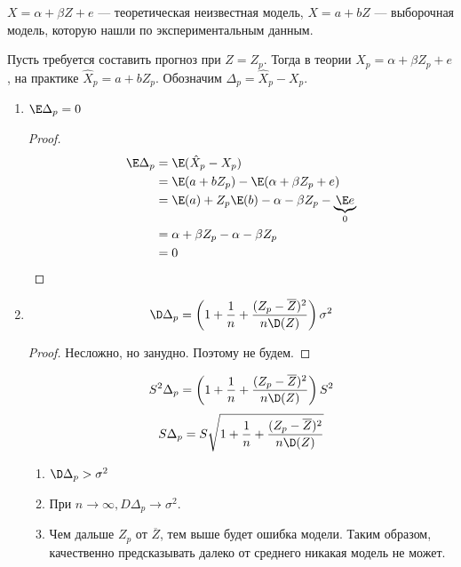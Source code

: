\(X = \alpha + \beta Z + e\) --- теоретическая неизвестная модель, \(X = a + bZ\) --- выборочная модель, которую нашли по экспериментальным данным.

Пусть требуется составить прогноз при \(Z = Z_p\). Тогда в теории \(X_p = \alpha + \beta Z_p + e\), на практике \(\hat{X}_p = a + bZ_p\). Обозначим \(\Delta_p = \hat{X}_p - X_p\).
\begin{prop}\itemfix
    \begin{enumerate}
        \item \(\E \Delta_p = 0\)
              \begin{proof}
                  \begin{align*}
                      \E \Delta_p & = \E( \hat{X}_p - X_p)                                        \\
                                  & = \E(a + bZ_p) - \E(\alpha + \beta Z_p + e)                   \\
                                  & = \E(a) + Z_p\E(b) - \alpha - \beta Z_p - \underbrace{\E e}_0 \\
                                  & = \alpha + \beta Z_p - \alpha - \beta Z_p                     \\
                                  & = 0
                  \end{align*}
              \end{proof}
        \item \[\D \Delta_p = \left(1 + \frac{1}{n} + \frac{(Z_p - \overline{Z})^2}{n \D(Z)}\right)\sigma^2\]
              \begin{proof}
                  Несложно, но занудно. Поэтому не будем.
              \end{proof}
              \[S^2 \Delta_p = \left(1 + \frac{1}{n} + \frac{(Z_p - \overline{Z})^2}{n \D(Z)}\right)S^2\]
              \[S \Delta_p = S\sqrt{1 + \frac{1}{n} + \frac{(Z_p - \overline{Z})^2}{n \D(Z)}}\]
              \begin{enumerate}
                  \item \(\D \Delta_p > \sigma^2\)
                  \item При \(n \to \infty, D \Delta_p \to \sigma^2\).
                  \item Чем дальше \(Z_p\) от \(\overline{Z}\), тем выше будет ошибка модели. Таким образом, качественно предсказывать далеко от среднего никакая модель не может.
              \end{enumerate}
    \end{enumerate}
\end{prop}
